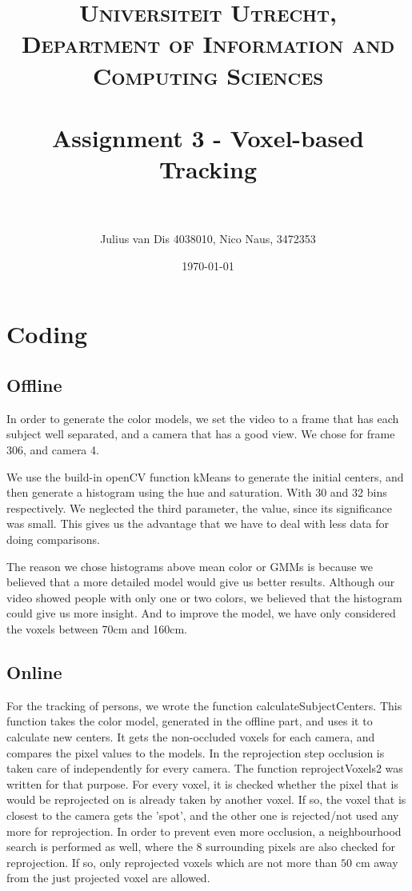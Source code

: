 \documentclass[paper=a4, fontsize=11pt]{scrartcl} %
\title{	
\normalfont \normalsize 
\textsc{Universiteit Utrecht, Department of Information and Computing Sciences} \\ [25pt] %
\horrule{0.5pt} \\[0.4cm] %
\huge Assignment 3 - Voxel-based Tracking \\ %
\horrule{2pt} \\[0.5cm] %
}
\author{Julius van Dis 4038010, Nico Naus, 3472353} %
\date{\normalsize\today} %
\numberwithin{equation}{section} %
\numberwithin{figure}{section} %
\numberwithin{table}{section} %
\begin{document}
\maketitle %

\section{Coding}

\subsection{Offline}
In order to generate the color models, we set the video to a frame that has each subject well separated, and a camera that has a good view. We chose for frame 306, and camera 4.

We use the build-in openCV function kMeans to generate the initial centers, and then generate a histogram using the hue and saturation. With 30 and 32 bins respectively. We neglected the third parameter, the value, since its significance was small. This gives us the advantage that we have to deal with less data for doing comparisons. 

The reason we chose histograms above mean color or GMMs is because we believed that a more detailed model would give us better results. Although our video showed people with only one or two colors, we believed that the histogram could give us more insight. And to improve the model, we have only considered the voxels between 70cm and 160cm.

\subsection{Online}
For the tracking of persons, we wrote the function calculateSubjectCenters. This function takes the color model, generated in the offline part, and uses it to calculate new centers. It gets the non-occluded voxels for each camera, and compares the pixel values to the models. In the reprojection step occlusion is taken care of independently for every camera. The function reprojectVoxels2 was written for that purpose. For every voxel, it is checked whether the pixel that is would be reprojected on is already taken by another voxel. If so, the voxel that is closest to the camera gets the 'spot', and the other one is rejected/not used any more for reprojection. In order to prevent even more occlusion, a neighbourhood search is performed as well, where the 8 surrounding pixels are also checked for reprojection. If so, only reprojected voxels which are not more than $50$ cm away from the just projected voxel are allowed.
\end{document}
